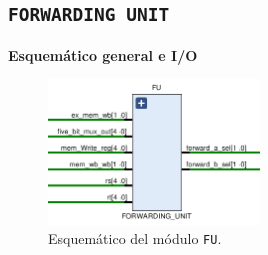 \documentclass[a4paper]{article}
\begin{document}
%		
%

\subsection{\texttt{FORWARDING UNIT}} \label{sec:fu}

\textbf{Esquemático general e I/O}

\begin{figure}[H]
	\begin{center}				
	\includegraphics[width=0.5\textwidth,center]{TP4_10.png}
  	\caption{Esquemático del módulo \texttt{FU}.}
  	\label{fig:funcionamiento.}
  	\end{center}
\end{figure}
\end{document}

